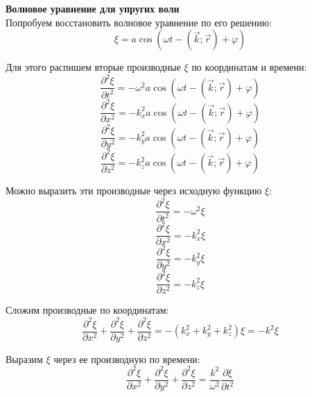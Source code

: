 \documentclass{article}
\begin{document}
	
	\textbf{Волновое уравнение для упругих волн}\\

	Попробуем восстановить волновое уравнение по его решению:
	\begin{equation}
		\xi = a\cos(\omega t - (\vec k;\vec r) + \varphi)
	\end{equation}

	Для этого распишем вторые производные $\xi$ по координатам и времени:
	\begin{equation}
		\frac{\partial^2\xi}{\partial t^2} = -\omega^2 a\cos(\omega t - (\vec k;\vec r) + \varphi)
	\end{equation}
	\begin{equation}
		\frac{\partial^2\xi}{\partial x^2} = -k_x^2 a\cos(\omega t - (\vec k;\vec r) + \varphi)
	\end{equation}
	\begin{equation}
		\frac{\partial^2\xi}{\partial y^2} = -k_y^2 a\cos(\omega t - (\vec k;\vec r) + \varphi)
	\end{equation}
	\begin{equation}
		\frac{\partial^2\xi}{\partial z^2} = -k_z^2 a\cos(\omega t - (\vec k;\vec r) + \varphi)
	\end{equation}

	Можно выразить эти производные через исходную функцию $\xi$:
	\begin{equation}
		\frac{\partial^2\xi}{\partial t^2} = -\omega^2\xi
	\end{equation}
	\begin{equation}
		\frac{\partial^2\xi}{\partial x^2} = -k_x^2\xi
	\end{equation}
	\begin{equation}
		\frac{\partial^2\xi}{\partial y^2} = -k_y^2\xi
	\end{equation}
	\begin{equation}
		\frac{\partial^2\xi}{\partial z^2} = -k_z^2\xi
	\end{equation}

	Сложим производные по координатам:
	\begin{equation}
		\frac{\partial^2\xi}{\partial x^2}+\frac{\partial^2\xi}{\partial y^2}+\frac{\partial^2\xi}{\partial z^2} = -(k_x^2+k_y^2+k_z^2)\xi = -k^2\xi
	\end{equation}

	Выразим $\xi$ через ее производную по времени:
	\begin{equation}
		\frac{\partial^2\xi}{\partial x^2}+\frac{\partial^2\xi}{\partial y^2}+\frac{\partial^2\xi}{\partial z^2} = \frac{k^2}{\omega^2}\frac{\partial\xi}{\partial t^2}		
	\end{equation}
\end{document}
